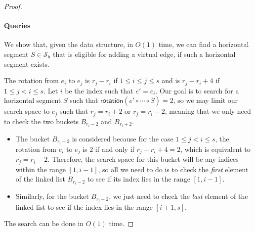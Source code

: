 \documentclass{theoretics}
\newcommand{\PH}{\mathcal{S}_\mathsf{h}}
\newcommand{\Nnorth}{\mathcal{N}_\mathsf{north}}
\newcommand{\rotation}{\mathsf{rotation}}
\begin{document}
\begin{proof}
\paragraph{Queries} We show that, given the data structure, in $O(1)$ time, we can find a horizontal segment $S \in \PH$ that is eligible for adding a virtual edge, if such a horizontal segment exists.

 The rotation  from $e_i$ to $e_j$ is $r_j - r_i$ if $1 \leq i \leq j \leq s$ and is $r_j - r_i +4$ if $1 \leq j < i \leq s$. Let $i$ be the index such that $e' = e_i$. Our goal is to search for a horizontal segment $S$ such that $\rotation(e' \circ \cdots \circ \overline{S}) = 2$, so we may limit our search space to $e_j$ such that 
 $r_j = r_i + 2$ or $r_j  = r_i -2$, meaning that we only need to check the two buckets $B_{r_i-2}$ and $B_{r_i+2}$.
 \begin{itemize}
     \item The bucket $B_{r_i-2}$ is considered because for the case $1 \leq j < i \leq s$, the rotation from $e_i$ to $e_j$ is $2$ if and only if $r_j - r_i +4 = 2$, which is equivalent to $r_j = r_i - 2$. Therefore, the search space for this bucket will be any indices within the range $[1,i-1]$, so all we need to do is to check the \emph{first} element of the linked list $B_{r_i-2}$ to see if its index lies in the range $[1,i-1]$.
     \item Similarly, for the bucket $B_{r_i+2}$, we just need to check the \emph{last} element of the linked list to see if the index lies in the range $[i+1, s]$.
 \end{itemize}
 The search can be done in $O(1)$ time.
 
 
 


\end{proof}
\end{document}
